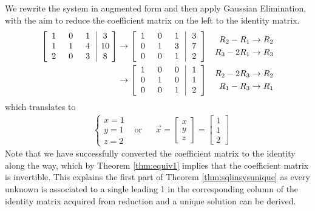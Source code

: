 \begin{solution}
We rewrite the system in augmented form and then apply Gaussian Elimination, with the aim to reduce the coefficient matrix on the left to the identity matrix.
\begin{align*}
\left[\begin{array}{@{\;}wc{10pt}wc{10pt}wc{10pt}|wc{10pt}@{\;}}
1 & 0 & 1 & 3 \\
1 & 1 & 4 & 10 \\
2 & 0 & 3 & 8
\end{array}\right] 
& \to 
\left[\begin{array}{@{\;}wc{10pt}wc{10pt}wc{10pt}|wc{10pt}@{\;}}
1 & 0 & 1 & 3 \\
0 & 1 & 3 & 7 \\
0 & 0 & 1 & 2
\end{array}\right] 
& \begin{aligned}
R_2-R_1 &\to R_2 \\
R_3-2R_1 &\to R_3 
\end{aligned} \\
& \to 
\left[\begin{array}{@{\;}wc{10pt}wc{10pt}wc{10pt}|wc{10pt}@{\;}}
1 & 0 & 0 & 1 \\
0 & 1 & 0 & 1 \\
0 & 0 & 1 & 2
\end{array}\right] 
& 
\begin{aligned}
R_2-2R_3 &\to R_2 \\
R_1-R_3 &\to R_1    
\end{aligned}
\end{align*}
which translates to
\begin{align*}
&
\begin{cases}
x = 1 \\
y = 1 \\
z = 2
\end{cases}
& \text{or} &
& \vec{x} = 
\begin{bmatrix}
x \\
y \\
z
\end{bmatrix}
=
\begin{bmatrix}
1 \\
1 \\
2
\end{bmatrix}
\end{align*}
Note that we have successfully converted the coefficient matrix to the identity along the way, which by Theorem \ref{thm:equiv1} implies that the coefficient matrix is invertible. This explains the first part of Theorem \ref{thm:sqlinsysunique} as every unknown is associated to a single leading 1 in the corresponding column of the identity matrix acquired from reduction and a unique solution can be derived.
\end{solution}

